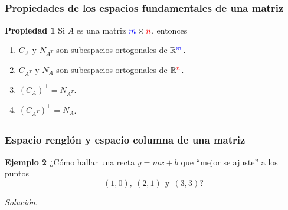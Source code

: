\subsection{}

\begin{frame}\frametitle{Propiedades de los espacios fundamentales de una matriz}
	
	\begin{prop}{\textbf{Propiedad 1}}
		\justifying
		Si $A$ es una matriz ${\color{blue}m}\times {\color{red}n}$, entonces
		\begin{enumerate}\justifying
			\item[\labelname{$a$}] $C_A$ y $N_{A^T}$ son subespacios ortogonales de $\mathbb{R}^{\color{blue}m}$.
			\item[\labelname{$b$}] $C_{A^T}$ y $N_{A}$ son subespacios ortogonales de $\mathbb{R}^{\color{red}n}$.
			\item[\labelname{$c$}] ${\left(C_A\right)}^{\perp} = N_{A^T}$.
			\item[\labelname{$d$}] ${\left(C_{A^T}\right)}^{\perp} = N_{A}$.
		\end{enumerate}
	\end{prop}		
	
\end{frame}


\subsection{}

\begin{frame}\frametitle{Espacio renglón y espacio columna de una matriz}
	
	\begin{ej}{\textbf{Ejemplo 2}}
		¿Cómo hallar una recta $y=mx+b$ que ``mejor se ajuste'' a los puntos 
		\[
			(1,0),\  (2,1) \ \ \text{y} \ \ (3,3)?
		\]
	\end{ej}
	\textit{Solución}.
	
\end{frame}


\subsection{}

